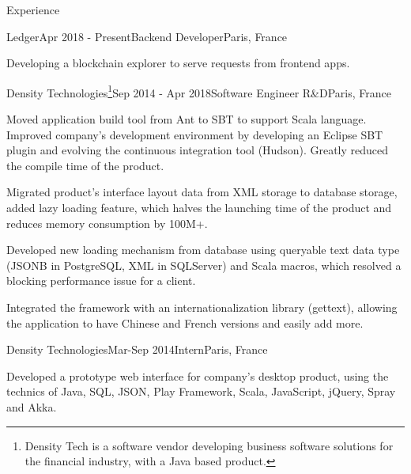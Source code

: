 \documentclass{resume} %
\begin{document}

\begin{rSection}{Experience}

\begin{rSubsection}{Ledger}{Apr 2018 - Present}{Backend Developer}{Paris, France}
\item Developing a blockchain explorer to serve requests from frontend apps.
\end{rSubsection}

\begin{rSubsection}{Density Technologies\footnote{Density Tech is a software vendor developing business software solutions for the financial industry, with a Java based product.}}{Sep 2014 - Apr 2018}{Software Engineer R\&D}{Paris, France}
\item Moved application build tool from Ant to SBT to support Scala language. Improved company's development environment by developing an Eclipse SBT plugin and evolving the continuous integration tool (Hudson). Greatly reduced the compile time of the product.
\item Migrated product's interface layout data from XML storage to database storage, added lazy loading feature, which halves the launching time of the product and reduces memory consumption by 100M+.
\item Developed new loading mechanism from database using queryable text data type (JSONB in PostgreSQL, XML in SQLServer) and Scala macros, which resolved a blocking performance issue for a client.
\item Integrated the framework with an internationalization library (gettext), allowing the application to have Chinese and French versions and easily add more.
\end{rSubsection}

\begin{rSubsection}{Density Technologies}{Mar-Sep 2014}{Intern}{Paris, France}
\item Developed a prototype web interface for company's desktop product, using the technics of Java, SQL, JSON, Play Framework, Scala, JavaScript, jQuery, Spray and Akka.
\end{rSubsection}

\end{rSection}


 
\end{document}
